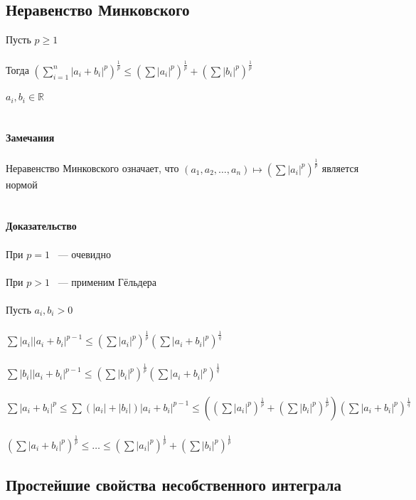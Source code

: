 \documentclass[../main.tex]{subfiles}
\begin{document}
\newpage


\subsection{Неравенство Минковского}
Пусть $p \geq 1$\\\\
Тогда $\left( \sum\limits_{i = 1}^n |a_i + b_i|^p\right)^{\frac{1}{p}} \leq \left( \sum |a_i|^p \right)^{\frac{1}{p}} + \left( \sum |b_i|^p \right)^{\frac{1}{p}}$\\\\
$a_i, b_i \in \mathbb{R}$\\\\\\
\textbf{Замечания}\\\\
Неравенство Минковского означает, что $(a_1, a_2, \ldots, a_n) \mapsto \left( \sum |a_i|^p \right)^{\frac{1}{p}}$ является нормой\\\\\\
\textbf{Доказательство}\\\\
При $p = 1$ ~--- очевидно\\\\
При $p > 1$ ~--- применим Гёльдера\\\\
Пусть $a_i, b_i > 0$\\\\
$\sum |a_i| |a_i + b_i|^{p - 1} \leq \left( \sum |a_i|^p \right)^{\frac{1}{p}} \left( \sum |a_i + b_i|^p \right)^{\frac{1}{q}}$\\\\
$\sum |b_i| |a_i + b_i|^{p - 1} \leq \left( \sum |b_i|^p \right)^{\frac{1}{p}} \left( \sum |a_i + b_i|^p \right)^{\frac{1}{q}}$\\\\
$\sum |a_i + b_i|^p \leq \sum ( |a_i| + |b_i| ) |a_i + b_i|^{p - 1} \leq \left( \left( \sum |a_i|^p \right)^{\frac{1}{p}} + \left( \sum |b_i|^p \right)^{\frac{1}{p}} \right) \left(\sum |a_i + b_i|^p \right)^{\frac{1}{q}}$\\\\
$\left( \sum |a_i + b_i|^p \right)^{\frac{1}{p}} \leq \ldots \leq \left( \sum |a_i|^p \right)^{\frac{1}{p}} + \left( \sum |b_i|^p \right)^{\frac{1}{p}}$

\newpage


\subsection{Простейшие свойства несобственного интеграла}
\end{document}
